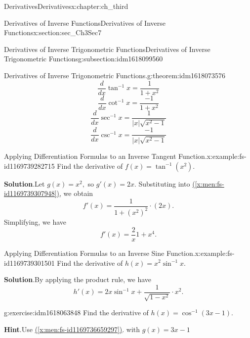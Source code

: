 \documentclass[oneside,10pt,]{book}
\newcommand{\blocktitlefont}{\relax}
\newcommand{\xreffont}{\relax}
\numberwithin{equation}{section}
\begin{document}
\begin{chapterptx}{Derivatives}{}{Derivatives}{}{}{x:chapter:ch_third}
\begin{sectionptx}{Derivatives of Inverse Functions}{}{Derivatives of Inverse Functions}{}{}{x:section:sec_Ch3Sec7}
\begin{subsectionptx}{Derivatives of Inverse Trigonometric Functions}{}{Derivatives of Inverse Trigonometric Functions}{}{}{g:subsection:idm1618099560}
\begin{theorem}{Derivatives of Inverse Trigonometric Functions.}{}{g:theorem:idm1618073576}
\begin{equation}
\end{equation}
%
\begin{equation}
\frac{d}{dx} \tan^{-1}x=\frac{1}{1+x^2}\label{x:men:fs-id1169739307948}
\end{equation}
%
\begin{equation}
\frac{d}{dx}\cot^{-1}x=\frac{-1}{1+x^2}\label{g:men:idm1618070888}
\end{equation}
%
\begin{equation}
\frac{d}{dx} \sec^{-1}x=\frac{1}{|x|\sqrt{x^2-1}}\label{g:men:idm1618071016}
\end{equation}
%
\begin{equation}
\frac{d}{dx} \csc^{-1}x=\frac{-1}{|x|\sqrt{x^2-1}}\label{g:men:idm1618070760}
\end{equation}
\end{theorem}
\begin{example}{Applying Differentiation Formulas to an Inverse Tangent Function.}{x:example:fs-id1169739282715}%
Find the derivative of \(f(x)=\tan^{-1}(x^2).\)%
\par\smallskip%
\noindent\textbf{\blocktitlefont Solution}.\hypertarget{g:solution:idm1618068584}{}\quad{}Let \(g(x)=x^2,\) so \(g'(x)=2x.\) Substituting into \hyperref[x:men:fs-id1169739307948]{({\xreffont\ref{x:men:fs-id1169739307948}})}, we obtain%
%
\begin{equation*}
f'(x)=\frac{1}{1+(x^2)^2}\cdot (2x).
\end{equation*}
Simplifying, we have%
%
\begin{equation*}
f'(x)=\frac{2}{x}{1+x^4}.
\end{equation*}
\end{example}
\begin{example}{Applying Differentiation Formulas to an Inverse Sine Function.}{x:example:fs-id1169739301501}%
Find the derivative of \(h(x)=x^2\sin^{-1}x.\)%
\par\smallskip%
\noindent\textbf{\blocktitlefont Solution}.\hypertarget{g:solution:idm1618063080}{}\quad{}By applying the product rule, we have%
%
\begin{equation*}
h'(x)=2x \sin^{-1}x+\frac{1}{\sqrt{1-x^2}}\cdot x^2.
\end{equation*}
\end{example}
\begin{inlineexercise}{}{g:exercise:idm1618063848}%
Find the derivative of \(h(x)=\cos^{-1}(3x-1).\)%
\par\smallskip%
\noindent\textbf{\blocktitlefont Hint}.\hypertarget{g:hint:idm1618063336}{}\quad{}Use \hyperref[x:men:fs-id1169736659297]{({\xreffont\ref{x:men:fs-id1169736659297}})}. with \(g(x)=3x-1\)%

\end{inlineexercise}
\end{subsectionptx}
\end{sectionptx}
\end{chapterptx}
\end{document}
